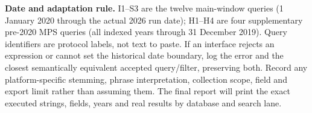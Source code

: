 \noindent\textbf{Date and adaptation rule.} I1--S3 are the twelve main-window queries (1 January 2020 through the actual 2026 run date); H1--H4 are four supplementary pre-2020 MPS queries (all indexed years through 31 December 2019). Query identifiers are protocol labels, not text to paste. If an interface rejects an expression or cannot set the historical date boundary, log the error and the closest semantically equivalent accepted query/filter, preserving both. Record any platform-specific stemming, phrase interpretation, collection scope, field and export limit rather than assuming them. The final report will print the exact executed strings, fields, years and real results by database and search lane.
